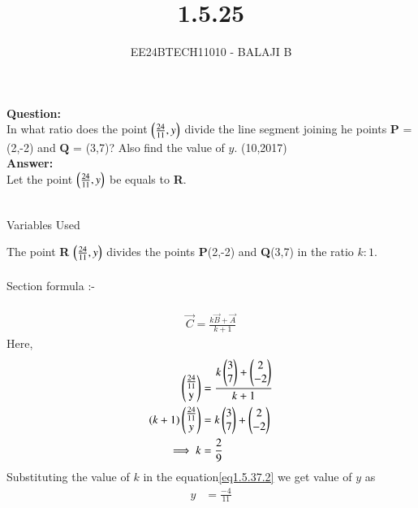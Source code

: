\documentclass[journal]{IEEEtran}
\begin{document}

\vspace{3cm}

\title{1.5.25}
\author{EE24BTECH11010 - BALAJI B}
{\let\newpage\relax\maketitle}

\renewcommand{\thefigure}{\theenumi}
\renewcommand{\thetable}{\theenumi}
\setlength{\intextsep}{10pt} %


\renewcommand{\thetable}{\theenumi}

\textbf{Question:}
\\
In what ratio does the point $\left(\frac{24}{11},y\right)$ divide the line segment joining he points $\textbf{P}$ = (2,-2) and $\textbf{Q}$ = (3,7)? Also find the value of $y$. \hfill(10,2017)\\ 


\textbf{Answer:} \\
Let the point $\left(\frac{24}{11},y\right)$ be equals to \textbf{R}.\\ \\

\begin{table}[h!]    
  \centering
  
  \caption{Variables Used}
  \label{tab1.5.37.1}
\end{table}

The point \textbf{R} $\left(\frac{24}{11},y\right)$ divides the points \textbf{P}(2,-2) and \textbf{Q}(3,7)
in the ratio $k:1$. \\ \\
Section formula :-\\ \\

\begin{align}
    \vec{C}=\frac{k\vec{B}+\vec{A}}{k+1}\label{eq1.5.37.1}
\end{align}
Here,
\begin{align}
    \myvec{\frac{24}{11}\\$y$} &= \frac{k \myvec{3\\7}+\myvec{2\\-2}}{k+1}\label{eq1.5.37.2}\\ 
    (k+1)\myvec{\frac{24}{11}\\y} &= k\myvec{3\\7}+ \myvec{2\\-2}\\
    \implies k &= \frac{2}{9}
\end{align}
Substituting the value of $k$ in the equation\ref{eq1.5.37.2} we get value of $y$ as
\begin{align}
    y &= \frac{-4}{11}
\end{align}
\end{document}
